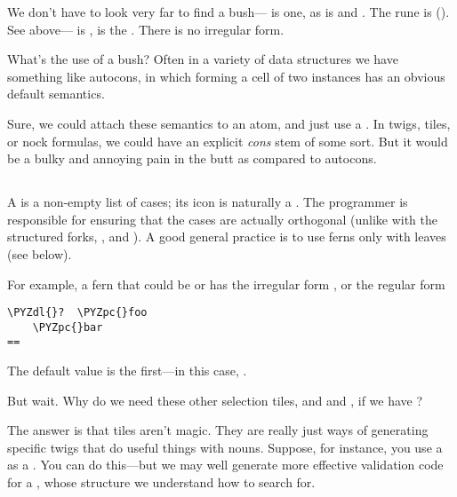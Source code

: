 We don't have to look very far to find a bush--- is one,
as is  and .  The rune is \kode{\$\&} ().  See
 above--- is \kode{[p=tile q=tile]},  is the \kode{\$\%}.
There is no irregular form.

What's the use of a bush?  Often in a variety of data structures
we have something like autocons, in which forming a cell of two
instances has an obvious default semantics.  

Sure, we could attach these semantics to an atom, and just use a
.  In twigs, tiles, or nock formulas, we could have an
explicit \emph{cons} stem of some sort.  But it would be a bulky and
annoying pain in the butt as compared to autocons.

\subsection{\kode{[\%fern p=[i=tile t=(list tile)]]}}

A  is a non-empty list of cases; its icon is naturally
a .  The programmer is responsible for ensuring that the
cases are actually orthogonal (unlike with the structured forks,
,  and ).  A good general practice is to use
ferns only with leaves (see below).

For example, a fern that could be  or  has the
irregular form , or the regular form

\begin{framed_shaded}
\begin{Verbatim}[fontsize=\relsize{-2.5},fontseries=b,commandchars=\\\{\}]
\PYZdl{}?  \PYZpc{}foo
    \PYZpc{}bar
==
\end{Verbatim}
\end{framed_shaded}
The default value is the first---in this case, .

But wait. Why do we need these other selection tiles,  and
 and , if we have ?

The answer is that tiles aren't magic.  They are really just ways
of generating specific twigs that do useful things with nouns.
Suppose, for instance, you use a  as a .  You can
do this---but we may well generate more effective validation code
for a , whose structure we understand how to search for.

